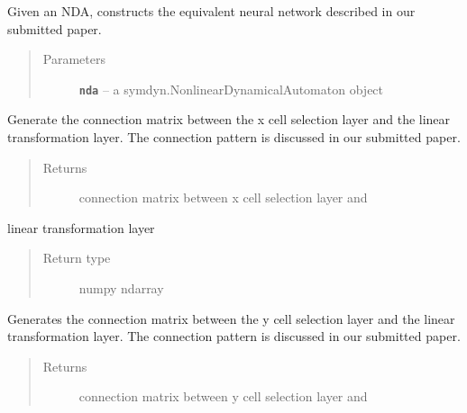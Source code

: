 \documentclass[letterpaper,10pt,english]{sphinxmanual}
\begin{document}
\begin{fulllineitems}
\label{neuraltm_docs:neuraltm.NeuralTM}
Given an NDA, constructs the equivalent neural network described in
our submitted paper.
\begin{quote}\begin{description}
\item[{Parameters}] \leavevmode
\textbf{\texttt{nda}} -- a symdyn.NonlinearDynamicalAutomaton object

\end{description}\end{quote}

\begin{fulllineitems}
\label{neuraltm_docs:neuraltm.NeuralTM.cn_BSLbx_LTL}
Generate the connection matrix between the x cell selection layer
and the linear transformation layer.  The connection pattern
is discussed in our submitted paper.
\begin{quote}\begin{description}
\item[{Returns}] \leavevmode
connection matrix between x cell selection layer and

\end{description}\end{quote}

linear transformation layer
\begin{quote}\begin{description}
\item[{Return type}] \leavevmode
numpy ndarray

\end{description}\end{quote}

\end{fulllineitems}


\begin{fulllineitems}
\label{neuraltm_docs:neuraltm.NeuralTM.cn_BSLby_LTL}
Generates the connection matrix between the y cell selection layer
and the linear transformation layer.  The connection pattern
is discussed in our submitted paper.
\begin{quote}\begin{description}
\item[{Returns}] \leavevmode
connection matrix between y cell selection layer and


\end{description}
\end{quote}
\end{fulllineitems}
\end{fulllineitems}
\end{document}
